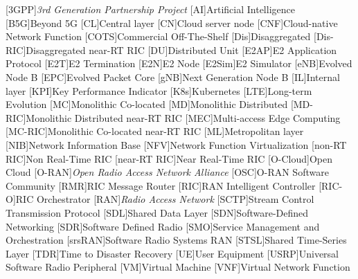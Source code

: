 [3GPP]{\textit{3rd Generation Partnership Project}}
[AI]{Artificial Intelligence}
[B5G]{Beyond 5G}
[CL]{Central layer}
[CN]{Cloud server node}
[CNF]{Cloud-native Network Function}
[COTS]{Commercial Off-The-Shelf}
[Dis]{Disaggregated}
[Dis-RIC]{Disaggregated near-RT \ac{RIC}}
[DU]{Distributed Unit}
[E2AP]{E2 Application Protocol}
[E2T]{E2 Termination}
[E2N]{E2 Node}
[E2Sim]{E2 Simulator}
[eNB]{Evolved Node B}
[EPC]{Evolved Packet Core}
[gNB]{Next Generation Node B}
[IL]{Internal layer}
[KPI]{Key Performance Indicator}
[K8s]{Kubernetes}
[LTE]{Long-term Evolution}
[MC]{Monolithic Co-located}
[MD]{Monolithic Distributed}
[MD-RIC]{Monolithic Distributed near-RT \ac{RIC}}
[MEC]{Multi-access Edge Computing}
[MC-RIC]{Monolithic Co-located near-RT \ac{RIC}}
[ML]{Metropolitan layer}
[NIB]{Network Information Base}
[NFV]{Network Function Virtualization}
[non-RT RIC]{Non Real-Time \ac{RIC}}
[near-RT RIC]{Near Real-Time \ac{RIC}}
[O-Cloud]{Open Cloud}
[O-RAN]{\textit{Open Radio Access Network Alliance}}
[OSC]{\ac{O-RAN} Software Community}
[RMR]{\ac{RIC} Message Router}
[RIC]{RAN Intelligent Controller}
[RIC-O]{\ac{RIC} Orchestrator}
[RAN]{\textit{Radio Access Network}}
[SCTP]{Stream Control Transmission Protocol}
[SDL]{Shared Data Layer}
[SDN]{Software-Defined Networking}
[SDR]{Software Defined Radio}
[SMO]{Service Management and Orchestration}
[srsRAN]{Software Radio Systems \ac{RAN}}
[STSL]{Shared Time-Series Layer}
[TDR]{Time to Disaster Recovery}
[UE]{User Equipment}
[USRP]{Universal Software Radio Peripheral}
[VM]{Virtual Machine}
[VNF]{Virtual Network Function}